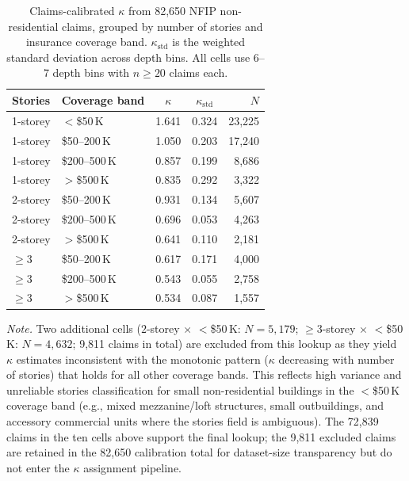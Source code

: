 \begin{table}[!htbp]
\centering
\begin{threeparttable}
\caption{Claims-calibrated $\kappa$ from 82{,}650 NFIP non-residential claims, grouped by number of stories and insurance coverage band. $\kappa_\text{std}$ is the weighted standard deviation across depth bins. All cells use 6--7 depth bins with $n \geq 20$ claims each.}
\label{tab: kappa claims}
\begin{tabular}{llccr}
\toprule
Stories & Coverage band & $\kappa$ & $\kappa_\text{std}$ & $N$ \\
\midrule
1-storey & $<$\$50\,K      & 1.641 & 0.324 & 23{,}225 \\
1-storey & \$50--200\,K    & 1.050 & 0.203 & 17{,}240 \\
1-storey & \$200--500\,K   & 0.857 & 0.199 &  8{,}686 \\
1-storey & $>$\$500\,K     & 0.835 & 0.292 &  3{,}322 \\
\midrule
2-storey & \$50--200\,K    & 0.931 & 0.134 &  5{,}607 \\
2-storey & \$200--500\,K   & 0.696 & 0.053 &  4{,}263 \\
2-storey & $>$\$500\,K     & 0.641 & 0.110 &  2{,}181 \\
\midrule
$\geq$3  & \$50--200\,K    & 0.617 & 0.171 &  4{,}000 \\
$\geq$3  & \$200--500\,K   & 0.543 & 0.055 &  2{,}758 \\
$\geq$3  & $>$\$500\,K     & 0.534 & 0.087 &  1{,}557 \\
\bottomrule
\end{tabular}
\begin{tablenotes}[flushleft]
\footnotesize
\item \textit{Note.} Two additional cells ($2$-storey $\times$ $<$\$50\,K: $N = 5{,}179$; $\geq$3-storey $\times$ $<$\$50\,K: $N = 4{,}632$; 9{,}811 claims in total) are excluded from this lookup as they yield $\kappa$ estimates inconsistent with the monotonic pattern ($\kappa$ decreasing with number of stories) that holds for all other coverage bands. This reflects high variance and unreliable stories classification for small non-residential buildings in the $<$\$50\,K coverage band (e.g., mixed mezzanine/loft structures, small outbuildings, and accessory commercial units where the stories field is ambiguous). The 72{,}839 claims in the ten cells above support the final lookup; the 9{,}811 excluded claims are retained in the 82{,}650 calibration total for dataset-size transparency but do not enter the $\kappa$ assignment pipeline.
\end{tablenotes}
\end{threeparttable}
\end{table}


